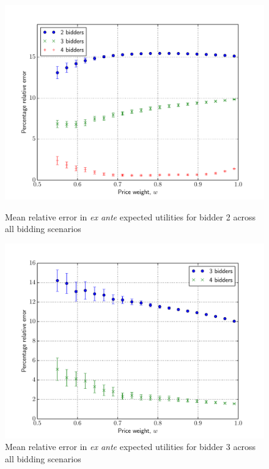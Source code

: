 \begin{figure}[p!]
  \includegraphics[width=\figsize]{Approximation/Figures/compare_bidder_2}
  \caption{Mean relative error in \emph{ex ante} expected utilities for bidder 2 across all bidding scenarios}
  \label{fig:compare_bidder_2_approximation}
  \vspace{10mm}
  \includegraphics[width=\figsize]{Approximation/Figures/compare_bidder_3}
  \caption{Mean relative error in \emph{ex ante} expected utilities for bidder 3 across all bidding scenarios}
  \label{fig:compare_bidder_3_approximation}
\end{figure}

